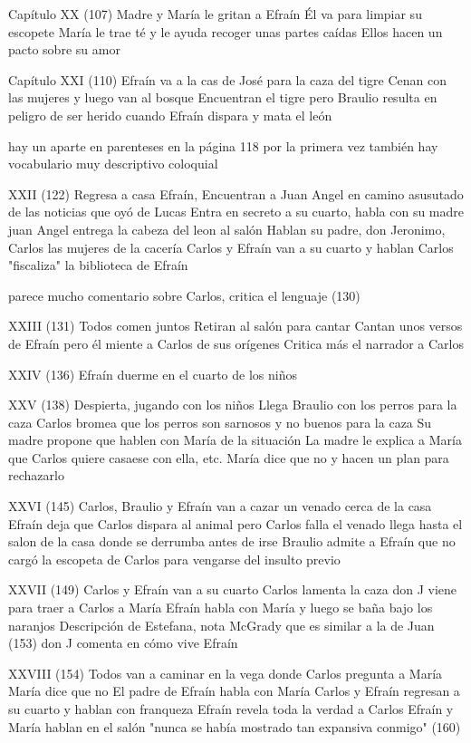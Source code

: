 Capítulo XX (107)
Madre y María le gritan a Efraín 
Él va para limpiar su escopete 
María le trae té y le ayuda recoger unas partes caídas
Ellos hacen un pacto sobre su amor

Capítulo XXI (110)
Efraín va a la cas de José para la caza del tigre
Cenan con las mujeres y luego van al bosque
Encuentran el tigre pero Braulio resulta en peligro de ser herido cuando Efraín dispara y mata el león

hay un aparte en parenteses en la página 118 por la primera vez
también hay vocabulario muy descriptivo coloquial 

XXII (122)
Regresa a casa Efraín,
Encuentran a Juan Angel en camino asusutado de las noticias que oyó de Lucas
Entra en secreto a su cuarto, habla con su madre
juan Angel entrega la cabeza del leon al salón 
Hablan su padre, don Jeronimo, Carlos  las mujeres de la cacería
Carlos y Efraín van a su cuarto y hablan
Carlos "fiscaliza" la biblioteca de Efraín

parece mucho comentario sobre Carlos, critica el lenguaje (130)

XXIII (131)
Todos comen juntos
Retiran al salón para cantar
Cantan unos versos de Efraín pero él miente a Carlos de sus orígenes
Critica más el narrador a Carlos

XXIV (136)
Efraín duerme en el cuarto de los niños 

XXV (138)
Despierta, jugando con los niños
Llega Braulio con los perros para la caza
Carlos bromea que los perros son sarnosos y no buenos para la caza
Su madre propone que hablen con María de la situación
La madre le explica a María que Carlos quiere casaese con ella, etc.
María dice que no y hacen un plan para rechazarlo

XXVI (145)
Carlos, Braulio y Efraín van a cazar un venado cerca de la casa
Efraín deja que Carlos dispara al animal pero Carlos falla
el venado llega hasta el salon de la casa donde se derrumba
antes de irse Braulio admite a Efraín que no cargó la escopeta de Carlos para vengarse del insulto previo

XXVII (149)
Carlos y Efraín van a su cuarto
Carlos lamenta la caza
don J viene para traer a Carlos a María
Efraín habla con María y luego se baña bajo los naranjos
Descripción de Estefana, nota McGrady que es similar a la de Juan (153)
don J comenta en cómo vive Efraín 

XXVIII (154)
Todos van a caminar en la vega donde Carlos pregunta a María
María dice que no
El padre de Efraín habla con María
Carlos y Efraín regresan a su cuarto y hablan con franqueza
Efraín revela toda la verdad a Carlos
Efraín y María hablan en el salón "nunca se había mostrado tan expansiva conmigo" (160)

